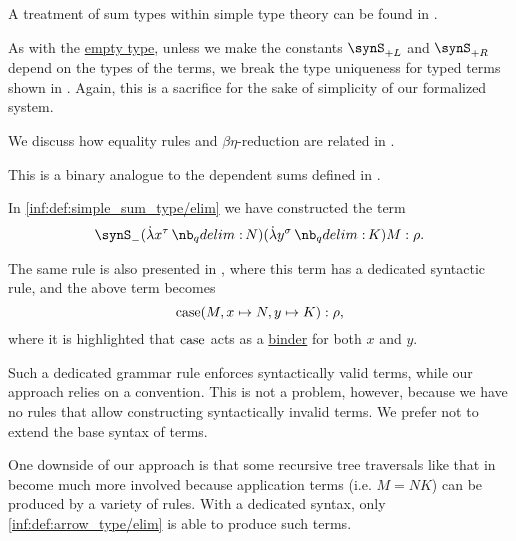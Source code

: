 \begin{comments}
  \item A treatment of sum types within simple type theory can be found in \cite[\S 4.3.3]{Mimram2020ProgramEqualsProof}.

  \item As with the \hyperref[def:simple_empty_type]{empty type}, unless we make the constants \( \synS_{+L} \) and \( \synS_{+R} \) depend on the types of the terms, we break the type uniqueness for typed terms shown in . Again, this is a sacrifice for the sake of simplicity of our formalized system.

  \item We discuss how equality rules and \( \beta\eta \)-reduction are related in .

  \item This is a binary analogue to the dependent sums defined in .
\end{comments}

\begin{remark}\label{rem:binders_in_type_theory_terms}
  In \ref{inf:def:simple_sum_type/elim} we have constructed the term
  \begin{equation*}
    \synS_- (\qabs {x^\tau} N) (\qabs {y^\sigma} K) M: \rho.
  \end{equation*}

  The same rule is also presented in \cite[\S 4.3.3]{Mimram2020ProgramEqualsProof}, where this term has a dedicated syntactic rule, and the above term becomes
  \begin{equation*}
    \op{case}(M, x \mapsto N, y \mapsto K): \rho,
  \end{equation*}
  where it is highlighted that \( \op{case} \) acts as a \hyperref[con:variable_binding]{binder} for both \( x \) and \( y \).

  Such a dedicated grammar rule enforces syntactically valid terms, while our approach relies on a convention. This is not a problem, however, because we have no rules that allow constructing syntactically invalid terms. We prefer not to extend the base syntax of terms.
\end{remark}
\begin{comments}
  \item One downside of our approach is that some recursive tree traversals like that in  become much more involved because application terms (i.e. \( M = NK \)) can be produced by a variety of rules. With a dedicated syntax, only \ref{inf:def:arrow_type/elim} is able to produce such terms.
\end{comments}

